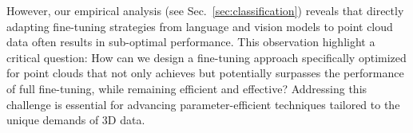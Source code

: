 However, our empirical analysis (see Sec.~\ref{sec:classification}) reveals that directly adapting fine-tuning strategies from language and vision models to point cloud data often results in sub-optimal performance. This observation highlight a critical question: How can we design a fine-tuning approach specifically optimized for point clouds that not only achieves but potentially surpasses the performance of full fine-tuning, while remaining efficient and effective? Addressing this challenge is essential for advancing parameter-efficient techniques tailored to the unique demands of 3D data.




